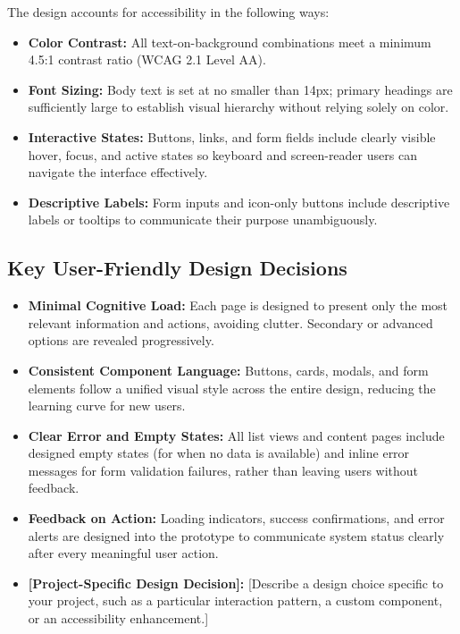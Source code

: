 \documentclass[12pt, a4paper]{article}
\begin{document}
The design accounts for accessibility in the following ways:
\begin{itemize}
    \item \textbf{Color Contrast:} All text-on-background combinations meet a minimum 4.5:1 contrast ratio (WCAG 2.1 Level AA).
    \item \textbf{Font Sizing:} Body text is set at no smaller than 14px; primary headings are sufficiently large to establish visual hierarchy without relying solely on color.
    \item \textbf{Interactive States:} Buttons, links, and form fields include clearly visible hover, focus, and active states so keyboard and screen-reader users can navigate the interface effectively.
    \item \textbf{Descriptive Labels:} Form inputs and icon-only buttons include descriptive labels or tooltips to communicate their purpose unambiguously.
\end{itemize}

\subsection{Key User-Friendly Design Decisions}

\begin{itemize}
    \item \textbf{Minimal Cognitive Load:} Each page is designed to present only the most relevant information and actions, avoiding clutter. Secondary or advanced options are revealed progressively.
    \item \textbf{Consistent Component Language:} Buttons, cards, modals, and form elements follow a unified visual style across the entire design, reducing the learning curve for new users.
    \item \textbf{Clear Error and Empty States:} All list views and content pages include designed empty states (for when no data is available) and inline error messages for form validation failures, rather than leaving users without feedback.
    \item \textbf{Feedback on Action:} Loading indicators, success confirmations, and error alerts are designed into the prototype to communicate system status clearly after every meaningful user action.
    \item \textbf{[Project-Specific Design Decision]:} [Describe a design choice specific to your project, such as a particular interaction pattern, a custom component, or an accessibility enhancement.]
\end{itemize}
\end{document}
